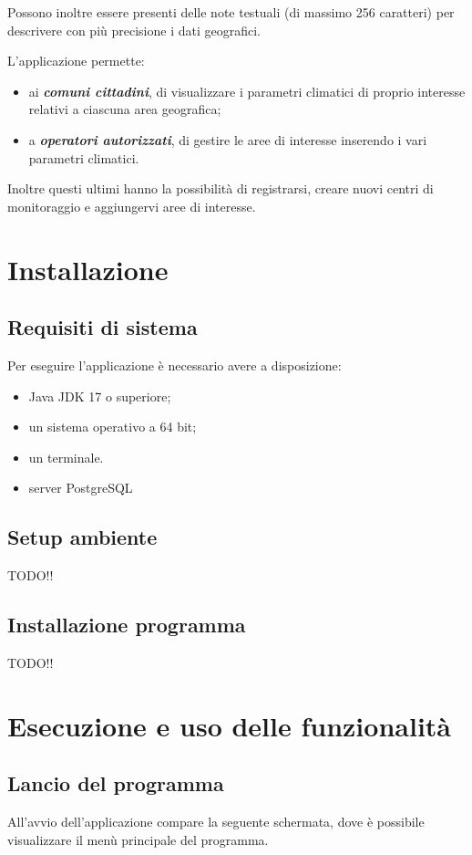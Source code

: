 Possono inoltre essere presenti delle note testuali (di massimo 256 caratteri) per descrivere con più precisione i dati geografici.

L'applicazione permette:
\begin{itemize}
	\item ai \textbf{\textsl{comuni cittadini}}, di visualizzare i parametri climatici di proprio interesse relativi a ciascuna area geografica;
	\item a \textbf{\textsl{operatori autorizzati}}, di gestire le aree di interesse inserendo i vari parametri climatici.
\end{itemize}
Inoltre questi ultimi hanno la possibilit\`a di registrarsi, creare nuovi centri di monitoraggio e aggiungervi aree di interesse.

\pagebreak

\chapter{Installazione}
\section{Requisiti di sistema}
Per eseguire l’applicazione \`e necessario avere a disposizione:
\begin{itemize}
	\item Java JDK 17 o superiore;
	\item un sistema operativo a 64 bit;
	\item un terminale.
	\item server PostgreSQL
\end{itemize}
\section{Setup ambiente}
TODO!!

\section{Installazione programma}
TODO!!

\chapter{Esecuzione e uso delle funzionalità}
\section{Lancio del programma}
All’avvio dell’applicazione compare la seguente schermata, dove è possibile visualizzare il menù principale del programma.
